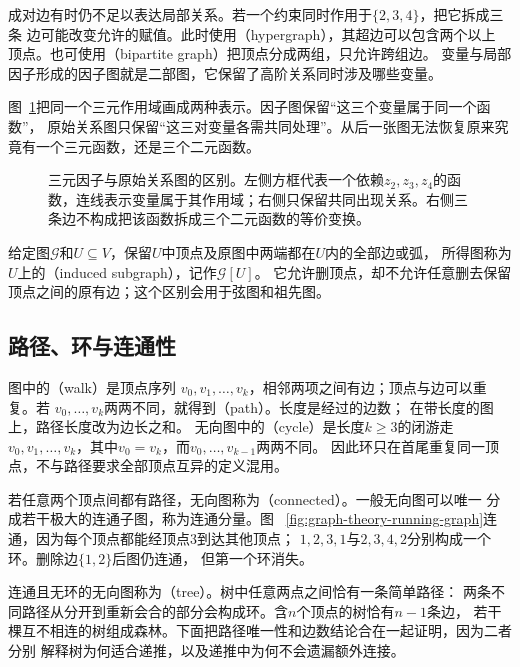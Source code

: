 成对边有时仍不足以表达局部关系。若一个约束同时作用于\(\{2,3,4\}\)，把它拆成三条
边可能改变允许的赋值。此时使用（hypergraph），其超边可以包含两个以上
顶点。也可使用（bipartite graph）把顶点分成两组，只允许跨组边。
变量与局部因子形成的因子图就是二部图，它保留了高阶关系同时涉及哪些变量。

图~\ref{fig:graph-theory-factor-scope}把同一个三元作用域画成两种表示。因子图保留“这三个变量属于同一个函数”，
原始关系图只保留“这三对变量各需共同处理”。从后一张图无法恢复原来究竟有一个三元函数，还是三个二元函数。

\begin{figure}[htbp]
  \centering
  
  \caption{三元因子与原始关系图的区别。左侧方框代表一个依赖\(z_2,z_3,z_4\)的函数，连线表示变量属于其作用域；右侧只保留共同出现关系。右侧三条边不构成把该函数拆成三个二元函数的等价变换。}
  \label{fig:graph-theory-factor-scope}
\end{figure}

给定图\(\mathcal G\)和\(U\subseteq V\)，保留\(U\)中顶点及原图中两端都在\(U\)内的全部边或弧，
所得图称为\(U\)上的（induced subgraph），记作\(\mathcal G[U]\)。
它允许删顶点，却不允许任意删去保留顶点之间的原有边；这个区别会用于弦图和祖先图。

\subsection{路径、环与连通性}

图中的（walk）是顶点序列
\(v_0,v_1,\ldots,v_k\)，相邻两项之间有边；顶点与边可以重复。若
\(v_0,\ldots,v_k\)两两不同，就得到（path）。长度是经过的边数；
在带长度的图上，路径长度改为边长之和。
无向图中的（cycle）是长度\(k\geq3\)的闭游走
\(v_0,v_1,\ldots,v_k\)，其中\(v_0=v_k\)，而\(v_0,\ldots,v_{k-1}\)两两不同。
因此环只在首尾重复同一顶点，不与路径要求全部顶点互异的定义混用。

若任意两个顶点间都有路径，无向图称为（connected）。一般无向图可以唯一
分成若干极大的连通子图，称为连通分量。图
~\ref{fig:graph-theory-running-graph}连通，因为每个顶点都能经顶点\(3\)到达其他顶点；
\(1,2,3,1\)与\(2,3,4,2\)分别构成一个环。删除边\(\{1,2\}\)后图仍连通，
但第一个环消失。

连通且无环的无向图称为（tree）。树中任意两点之间恰有一条简单路径：
两条不同路径从分开到重新会合的部分会构成环。含\(n\)个顶点的树恰有\(n-1\)条边，
若干棵互不相连的树组成森林。下面把路径唯一性和边数结论合在一起证明，因为二者分别
解释树为何适合递推，以及递推中为何不会遗漏额外连接。

